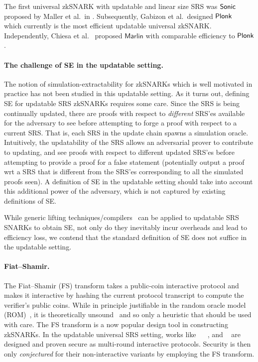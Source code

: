 The first universal zkSNARK with updatable and linear size SRS was
${\textnormal{\textsf{Sonic}}}$ proposed by Maller et al.~in \cite{CCS:MBKM19}. Subsequently, Gabizon et
al.~designed $\textnormal{\textsf{Plonk}}$~\cite{EPRINT:GabWilCio19} which currently is the
most efficient updatable universal zkSNARK. Independently, Chiesa et
al.~\cite{EC:CHMMVW20} proposed $\textsf{Marlin}$ with comparable efficiency to
$\textnormal{\textsf{Plonk}}$.

\paragraph{The challenge of SE in the updatable setting.}

The notion of simulation-extractability for zkSNARKs which is well motivated in practice has not been studied in this updatable setting. As it turns out, defining SE for updatable SRS zkSNARKs requires some care. Since the SRS is being continually updated, there are proofs with respect to \textit{different} SRS'es available for the adversary to see before attempting to forge a proof with respect to a current SRS. 
That is, each SRS in the update chain spawns a simulation oracle. Intuitively, the updatability of the SRS allows an adversarial prover to contribute to updating, and see proofs with respect to different updated SRS'es before attempting to provide a proof for a false statement (potentially output a proof wrt a SRS that is different from the SRS'es corresponding to all the simulated proofs seen). A definition of SE in the updatable setting should take into account this additional power of the adversary, which is not captured by existing definitions of SE.

While generic lifting techniques/compilers~\cite{EPRINT:KZMQCP15,CCS:AbdRamSla20} can be applied to updatable SRS SNARKs to obtain SE, not only do they inevitably incur overheads and lead to efficiency loss, we contend that the standard definition of SE does not suffice in the updatable setting.


\paragraph{Fiat--Shamir.}
The Fiat--Shamir (FS) transform takes a public-coin interactive protocol and
makes it interactive by hashing the current protocol transcript to compute the
verifier's public coins. While in principle justifiable in the random oracle
model (ROM)~\cite{CCS:BelRog93}, it is theoretically
unsound~\cite{FOCS:GolKal03} and so only a heuristic that should be used with
care.
%
The FS transform is a now popular design tool in constructing
zkSNARKs. In the updatable universal SRS setting, works like \sonic{}~\cite{CCS:MBKM19}
\plonk{}~\cite{EPRINT:GabWilCio19}, and \marlin~\cite{EC:CHMMVW20} are designed
and proven secure as multi-round interactive protocols. Security is then only
\emph{conjectured} for their non-interactive variants by employing the FS
transform.


